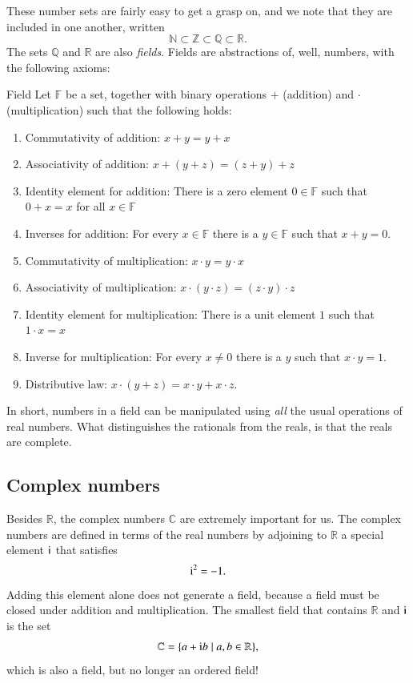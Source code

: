 These number sets are fairly easy to get a grasp on, and we note that they are included in one another, written
\begin{equation}
    \mathbb{N} \subset \mathbb{Z} \subset \mathbb{Q} \subset \mathbb{R}.
\end{equation}
The sets $\mathbb{Q}$ and $\mathbb{R}$ are also \emph{fields}. Fields are abstractions of, well, numbers, with the following axioms:
\begin{myDefinition}{Field}{} Let $\mathbb{F}$ be a set, together with binary operations $+$ (addition) and $\cdot$ (multiplication) such that the following holds:
\begin{enumerate}
    \item Commutativity of addition: $x + y = y + x$
    \item Associativity of addition: $x + (y + z) = (z + y) + z$
    \item Identity element for addition: There is a zero element $0 \in \mathbb{F}$ such that $0 + x = x$ for all $x \in \mathbb{F}$
    \item Inverses for addition: For every $x \in \mathbb{F}$ there is a $y \in \mathbb{F}$ such that $x + 
    y = 0$.
    \item Commutativity of multiplication: $x \cdot y = y \cdot x$
    \item Associativity of multiplication: $x \cdot (y \cdot z) = (z \cdot y) \cdot z$
    \item Identity element for multiplication: There is a unit element $1$ such that $1 \cdot x = x$
    \item Inverse for multiplication: For every $x \neq 0$ there is a $y$ such that $x\cdot y = 1$.
    \item Distributive law: $x\cdot (y + z) = x\cdot y + x \cdot z$. 
\end{enumerate}
\end{myDefinition}
In short, numbers in a field can be manipulated using \emph{all} the usual operations of real numbers. What distinguishes the rationals from the reals, is that the reals are complete.

\subsection{Complex numbers}

Besides $\mathbb{R}$, the complex numbers $\mathbb{C}$ are extremely important for us. The complex numbers are defined in terms of the real numbers by adjoining to $\mathbb{R}$ a special element $\mathrm{i}$ that satisfies
\begin{equation}
    \mathrm{i}^2 = -1.
\end{equation}
Adding this element alone does not generate a field, because a field must be closed under addition and multiplication.
The smallest field that contains $\mathbb{R}$ and $\mathrm{i}$ is the set
\begin{equation}
    \mathbb{C} = \{ a + \mathrm{i} b \mid a, b \in \mathbb{R} \},
\end{equation}
which is also a field, but no longer an ordered field!


